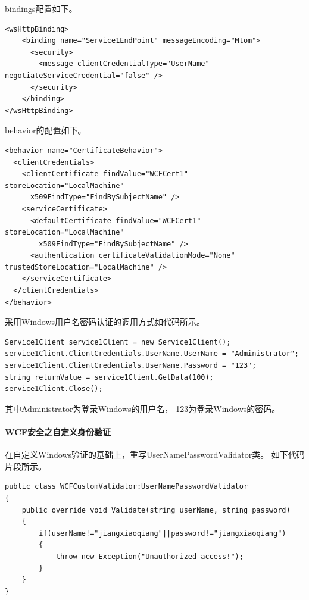 \documentclass{book}
\begin{document}
bindings配置如下。

\begin{lstlisting}
<wsHttpBinding>
	<binding name="Service1EndPoint" messageEncoding="Mtom">
	  <security>
	    <message clientCredentialType="UserName" negotiateServiceCredential="false" />
	  </security>
	</binding>
</wsHttpBinding>
\end{lstlisting}

behavior的配置如下。

\begin{lstlisting}
<behavior name="CertificateBehavior">
  <clientCredentials>
    <clientCertificate findValue="WCFCert1" storeLocation="LocalMachine"
      x509FindType="FindBySubjectName" />
    <serviceCertificate>
      <defaultCertificate findValue="WCFCert1" storeLocation="LocalMachine"
        x509FindType="FindBySubjectName" />
      <authentication certificateValidationMode="None" trustedStoreLocation="LocalMachine" />
    </serviceCertificate>
  </clientCredentials>
</behavior>
\end{lstlisting}

采用Windows用户名密码认证的调用方式如代码所示。

\begin{lstlisting}[language={[Sharp]C},caption=认证方式调用WCF接口,label=CertificateInvokeWCF]
Service1Client service1Client = new Service1Client();
service1Client.ClientCredentials.UserName.UserName = "Administrator";
service1Client.ClientCredentials.UserName.Password = "123";
string returnValue = service1Client.GetData(100);
service1Client.Close();
\end{lstlisting}

其中Administrator为登录Windows的用户名，
123为登录Windows的密码。

\paragraph{WCF安全之自定义身份验证}

在自定义Windows验证的基础上，重写UserNamePasswordValidator类。
如下代码片段所示。

\begin{lstlisting}[language={[Sharp]C},caption=自定义验证方式]
public class WCFCustomValidator:UserNamePasswordValidator
{
    public override void Validate(string userName, string password)
    {
        if(userName!="jiangxiaoqiang"||password!="jiangxiaoqiang")
        {
            throw new Exception("Unauthorized access!");
        }
    }
}
\end{lstlisting}
\end{document}
